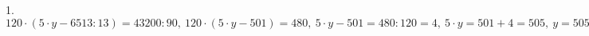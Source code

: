 1. $120\cdot(5\cdot y-6513:13)=43200:90,\ 120\cdot(5\cdot y-501)=480,\ 5\cdot y-501=480:120=4,\ 5\cdot y=501+4=505,\ y=505:5=101.$\\
